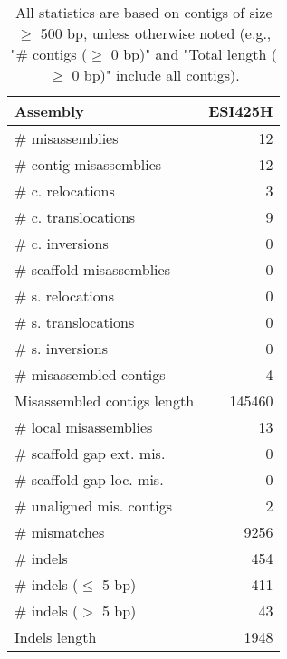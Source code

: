 \documentclass[12pt,a4paper]{article}
\begin{document}
\begin{table}[ht]
\begin{center}
\caption{All statistics are based on contigs of size $\geq$ 500 bp, unless otherwise noted (e.g., "\# contigs ($\geq$ 0 bp)" and "Total length ($\geq$ 0 bp)" include all contigs).}
\begin{tabular}{|l*{1}{|r}|}
\hline
Assembly & ESI425H \\ \hline
\# misassemblies & 12 \\ \hline
\hspace{2mm}\# contig misassemblies & 12 \\ \hline
\hspace{5mm}\# c. relocations & 3 \\ \hline
\hspace{5mm}\# c. translocations & 9 \\ \hline
\hspace{5mm}\# c. inversions & 0 \\ \hline
\hspace{2mm}\# scaffold misassemblies & 0 \\ \hline
\hspace{5mm}\# s. relocations & 0 \\ \hline
\hspace{5mm}\# s. translocations & 0 \\ \hline
\hspace{5mm}\# s. inversions & 0 \\ \hline
\# misassembled contigs & 4 \\ \hline
Misassembled contigs length & 145460 \\ \hline
\# local misassemblies & 13 \\ \hline
\# scaffold gap ext. mis. & 0 \\ \hline
\# scaffold gap loc. mis. & 0 \\ \hline
\# unaligned mis. contigs & 2 \\ \hline
\# mismatches & 9256 \\ \hline
\# indels & 454 \\ \hline
\hspace{5mm}\# indels ($\leq$ 5 bp) & 411 \\ \hline
\hspace{5mm}\# indels ($>$ 5 bp) & 43 \\ \hline
Indels length & 1948 \\ \hline
\end{tabular}
\end{center}
\end{table}
\end{document}
